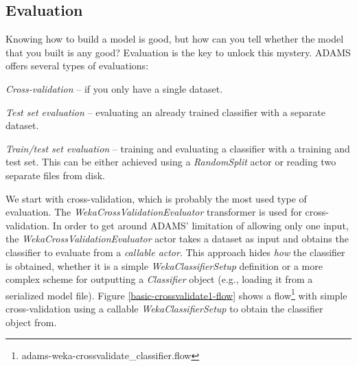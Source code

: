 \clearpage
\subsection{Evaluation}
Knowing how to build a model is good, but how can you tell whether the model
that you built is any good? Evaluation is the key to unlock this mystery.
ADAMS offers several types of evaluations:
\begin{tight_itemize}
	\item \textit{Cross-validation} -- if you only have a single dataset.
	\item \textit{Test set evaluation} -- evaluating an already trained classifier
	with a separate dataset.
	\item \textit{Train/test set evaluation} -- training and evaluating a
	classifier with a training and test set. This can be either achieved using a
	\textit{RandomSplit} actor or reading two separate files from disk.
\end{tight_itemize}

We start with cross-validation, which is probably the most used type of
evaluation. The \textit{WekaCrossValidationEvaluator} transformer is used for
cross-validation. In order to get around ADAMS' limitation of allowing only one
input, the \textit{WekaCrossValidationEvaluator} actor takes a dataset as input
and obtains the classifier to evaluate from a \textit{callable actor}. This
approach hides \textit{how} the classifier is obtained, whether it is a simple
\textit{WekaClassifierSetup} definition or a more complex scheme for outputting a
\textit{Classifier} object (e.g., loading it from a serialized model file).
Figure \ref{basic-crossvalidate1-flow} shows a
flow\footnote{adams-weka-crossvalidate\_classifier.flow} with simple
cross-validation using a callable \textit{WekaClassifierSetup} to obtain the classifier
object from.

